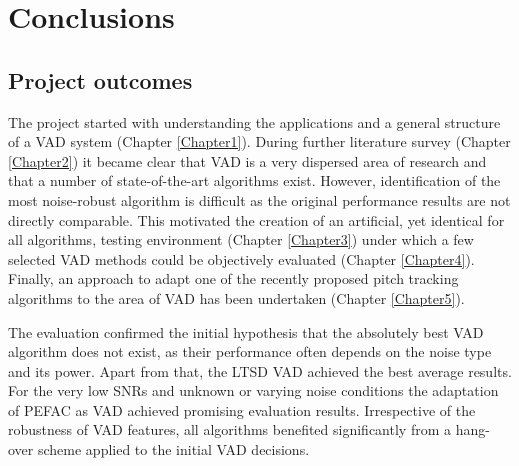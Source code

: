 
\chapter{Conclusions} %

\label{Chapter6} %



\section{Project outcomes}

The project started with understanding the applications and a general structure of a VAD system (Chapter \ref{Chapter1}). During further literature survey (Chapter \ref{Chapter2}) it became clear that VAD is a very dispersed area of research and that a number of state-of-the-art algorithms exist. However, identification of the most noise-robust algorithm is difficult as the original performance results are not directly comparable. This motivated the creation of an artificial, yet identical for all algorithms, testing environment (Chapter \ref{Chapter3}) under which a few selected VAD methods could be objectively evaluated (Chapter \ref{Chapter4}). Finally, an approach to adapt one of the recently proposed pitch tracking algorithms to the area of VAD has been undertaken (Chapter \ref{Chapter5}).

The evaluation confirmed the initial hypothesis that the absolutely best VAD algorithm does not exist, as their performance often depends on the noise type and its power. Apart from that, the LTSD VAD achieved the best average results. For the very low SNRs and unknown or varying noise conditions the adaptation of PEFAC as VAD achieved promising evaluation results. Irrespective of the robustness of VAD features, all algorithms benefited significantly from a hang-over scheme applied to the initial VAD decisions.


